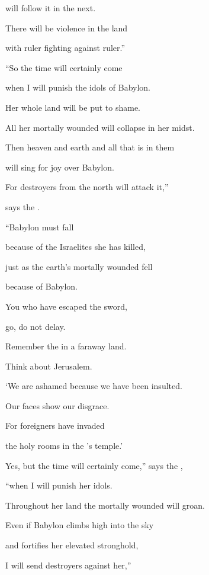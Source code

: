 {will follow
it in the next.
\par }{\Q There will be violence
in the land
\par }{\Q with ruler
fighting against
ruler.”
\par }{\Q {}“So
the time
will certainly
come
\par }{\Q when I will punish
the idols
of Babylon.
\par }{\Q Her whole
land
will be put to shame.
\par }{\Q All
her mortally wounded
will collapse
in her midst.
\par }{\Q {}Then heaven
and earth
and all
that
is in them
\par }{\Q will sing
for joy over
Babylon.
\par }{\Q For
destroyers
from the north
will attack
it,”
\par }{\Q says
the {}.
\par }{\Q {}“Babylon
must fall
\par }{\Q because of the Israelites
she has killed,
\par }{\Q just as
the earth’s
mortally wounded
fell
\par }{\Q because of Babylon.
\par }{\Q {}You who have escaped
the sword,
\par }{\Q go,
do not
delay.
\par }{\Q Remember
the {}
in a faraway
land.
\par }{\Q Think
about Jerusalem.
\par }{\Q {}‘We are ashamed
because
we
have been insulted.
\par }{\Q Our faces
show our disgrace.
\par }{\Q For
foreigners
have invaded
\par }{\Q the holy rooms
in the
{}’s
temple.’
\par }{\Q {}Yes,
but the time
will certainly come,”
says
the {},

\par }{\Q “when I will punish
her idols.
\par }{\Q Throughout
her land
the mortally wounded
will groan.
\par }{\Q {}Even if
Babylon
climbs
high into the sky
\par }{\Q and fortifies
her elevated
stronghold,
\par }{\Q I will send
destroyers
against her,”

}
